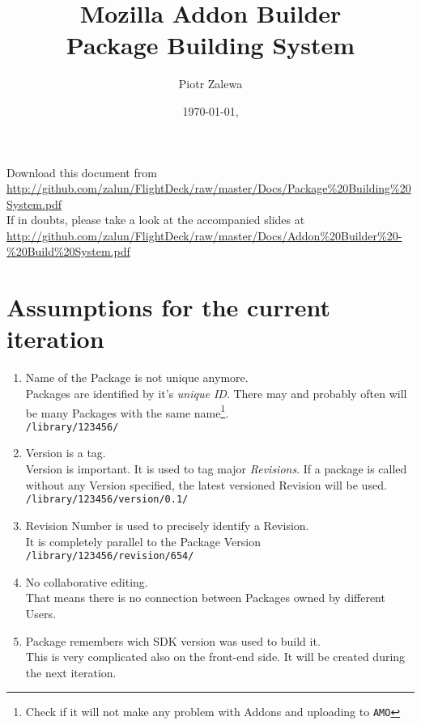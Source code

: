 \documentclass[10pt]{article}
\title{Mozilla Addon Builder\\ Package Building System}
\author{Piotr Zalewa}
\date{\today, \version}
\def\amo{{\tt AMO}}
\begin{document}
\maketitle

{\scriptsize
	\noindent Download this document from \\
\url{http://github.com/zalun/FlightDeck/raw/master/Docs/Package%20Building\%20System.pdf}\\
}{\scriptsize
	\noindent If in doubts, please take a look at the accompanied slides at \\
	\url{http://github.com/zalun/FlightDeck/raw/master/Docs/Addon\%20Builder\%20-\%20Build\%20System.pdf}
}

\section{Assumptions for the current iteration}

	\begin{enumerate}
		\item{Name of the Package is not unique anymore.\\
			Packages are identified by it's {\em unique ID}. There may and probably often will be many
			Packages with the same name\footnote{Check if it will not make any problem with Addons and 
			uploading to \amo}.\\
			{\tt /library/123456/}}
		\item{Version is a tag.\\
			Version is important. It is used to tag major {\em Revisions}. If a package is called without any
			Version specified, the latest versioned Revision will be used.\\
			{\tt /library/123456/version/0.1/}}
		\item{Revision Number is used to precisely identify a Revision.\\
			It is completely parallel to the Package Version\\
			{\tt /library/123456/revision/654/}}
		\item{No collaborative editing.\\
			That means there is no connection between Packages owned by different Users.}
		\item{Package remembers wich SDK version was used to build it.\\
			This is very complicated also on the front-end side. It will be created during the next
			iteration.}
	\end{enumerate}
\end{document}
